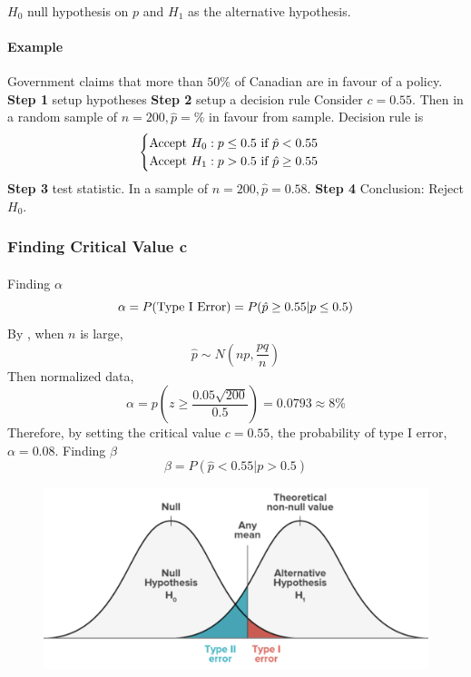 \documentclass{article}
\begin{document}
			\paragraph{} $H_0$ null hypothesis on $p$ and $H_1$ as the alternative hypothesis.
			
			\paragraph{Example} Government claims that more than $50\%$ of Canadian are in favour of a policy.
			\newline
			\textbf{Step 1} setup hypotheses 
			\newline
			\textbf{Step 2} setup a decision rule 
			\newline Consider $c=0.55$. Then in a random sample of $n=200, \hat{p} = \%$ in favour from sample. Decision rule is
			\[
				\begin{cases}
					\text{{Accept $H_0: p \leq 0.5$ if $\hat{p} < 0.55$}} \\
					\text{{Accept $H_1: p > 0.5$ if $\hat{p} \geq 0.55$}}
				\end{cases}
			\]
			\newline \textbf{Step 3} test statistic. In a sample of $n=200, \hat{p}=0.58$.
			\newline \textbf{Step 4} Conclusion: Reject $H_0$.
			
			\subsubsection{Finding Critical Value c}
				\paragraph{} Finding $\alpha$
					\[
						\alpha = P(\text{{Type I Error}}) = P(\hat{p}\geq 0.55 \vert p \leq 0.5)
					\]
					By , when $n$ is large,
					\[
						\hat{p} \sim N(np, \frac{pq}{n})
					\]
					Then normalized data, 
					\[
						\alpha = p(z \geq \frac{0.05 \sqrt{200}}{0.5}) = 0.0793 \approx 8\%
					\]
					Therefore, by setting the critical value $c=0.55$, the probability of type I error, $\alpha = 0.08$.
					\newline
					Finding $\beta$
					\[
						\beta = P(\hat{p} < 0.55 \vert p > 0.5)
					\]
				\begin{figure}[h]
					\begin{center}
						\includegraphics[width=0.4\linewidth]{fig3}
					\end{center}
				\end{figure}
				
\end{document}
